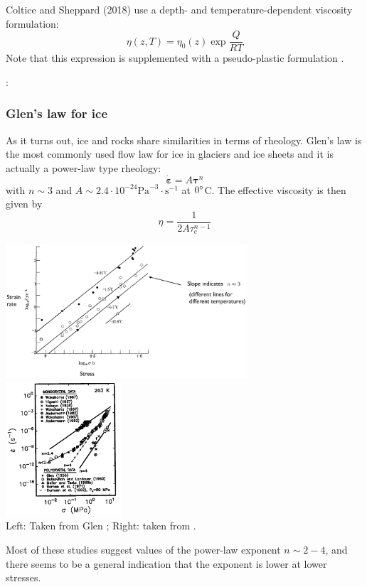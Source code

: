 Coltice and Sheppard (2018) \cite{cosh18} use a depth- and temperature-dependent 
viscosity formulation:
\[
\eta(z,T)=\eta_0(z) \exp \frac{Q}{RT}
\]
Note that this expression is supplemented with a pseudo-plastic formulation \cite{roct12}.

\Literature: \cite{king16}

\subsubsection{Glen's law for ice}

As it turns out, ice and rocks share similarities in terms of rheology.
Glen’s law is the most commonly used flow law for ice in glaciers and ice sheets \cite{glen55}
and it is actually a power-law type rheology:
\[
\dot{\bm \varepsilon} = A {\bm \tau}^n 
\]
with $n\sim 3$ and $A\sim 2.4\cdot 10^{-24} \text{Pa}^{-3}\cdot \text{s}^{-1}$ at $0\degree$C.
The effective viscosity is then given by
\[
\eta = \frac{1}{2 A \tau_e^{n-1}} 
\]
\begin{center}
\includegraphics[height=5cm]{images/rheology/glen}
\includegraphics[height=5cm]{images/rheology/goko01}\\
{\scriptsize Left: Taken from Glen \cite{glen55}; Right: taken from \cite{goko01}.}
\end{center}
Most of these studies suggest values of the power-law exponent $n\sim 2-4$, and there seems to be 
a general indication that the exponent is lower at lower stresses.

